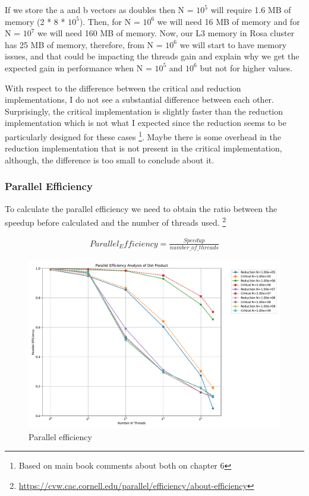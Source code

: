 \documentclass[unicode,11pt,a4paper,oneside,numbers=endperiod,openany]{scrartcl}
\begin{document}
If we store the a and b vectors as doubles then N = $10^5$ will require 1.6 MB of memory (2 *  8 * $10^5$). 
Then, for N = $10^6$ we will need 16 MB of memory and for N = $10^7$ we will need 160 MB of memory. Now, our L3 memory in 
Rosa cluster has 25 MB of memory, therefore, from N = $10^6$ we will start to have memory issues, and that could be impacting the threads gain 
and explain why we get the expected gain in performance when N = $10^5$ and $10^6$ but not for higher values.

With respect to the difference between the critical and reduction implementations, I do not see a substantial difference between each other. 
Surprisingly, the critical implementation is slightly faster than the reduction implementation which is not what I expected since the reduction seems to be 
particularly designed for these cases \footnote{Based on main book comments about both on chapter 6}. Maybe there is some overhead in the reduction implementation 
that is not present in the critical implementation, although, the difference is too small to conclude about it.

\subsubsection{Parallel Efficiency}

To calculate the parallel efficiency we need to obtain the ratio between the speedup before calculated and the number of threads used. \footnote{\url{https://cvw.cac.cornell.edu/parallel/efficiency/about-efficiency}}

\begin{align*}
    Parallel_Efficiency = \frac{Speedup}{number\_of\_threads}
\end{align*}

\begin{figure}[H]
    \centering
    \includegraphics[width=\textwidth]{./img/exe1/dotproduct_parallel_efficiency.pdf}
    \caption{Parallel efficiency}
\end{figure}
\end{document}
